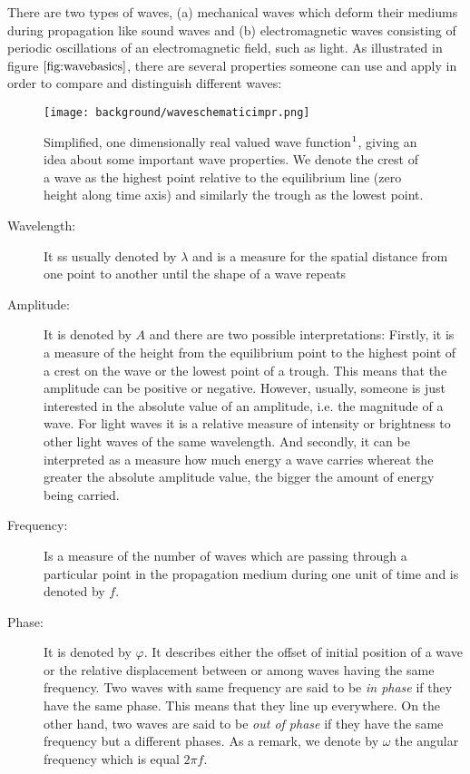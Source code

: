 There are two types of waves, (a) mechanical waves which deform their mediums during propagation like sound waves and (b) electromagnetic waves consisting of periodic oscillations of an electromagnetic field, such as light. As illustrated in figure $\ref{fig:wavebasics}$, there are several properties someone can use and apply in order to compare and distinguish different waves:

\begin{figure}[H]
  \centering
  \texttt{[image: background/waveschematicimpr.png]}
  \caption[Sinewave]{Simplified, one dimensionally real valued wave function$\footnotemark$, giving an idea about some important wave properties. We denote the crest of a wave as the highest point relative to the equilibrium line (zero height along time axis) and similarly the trough as the lowest point.}
  \label{fig:wavebasics}
\end{figure}

\begin{description}
  \item[Wavelength:] It ss usually denoted by $\lambda$ and is a measure for the spatial distance from one point to another until the shape of a wave repeats
  \item[Amplitude:] It is denoted by $A$ and there are two possible interpretations: Firstly, it is a measure of the height from the equilibrium point to the highest point of a crest on the wave or the lowest point of a trough. This means that the amplitude can be positive or negative. However, usually, someone is just interested in the absolute value of an amplitude, i.e. the magnitude of a wave. For light waves it is a relative measure of intensity or brightness to other light waves of the same wavelength. And secondly, it can be interpreted as a measure how much energy a wave carries whereat the greater the absolute amplitude value, the bigger the amount of energy being carried.
  \item[Frequency:] Is a measure of the number of waves which are passing through a particular point in the propagation medium during one unit of time and is denoted by $f$.
  \item[Phase:] It is denoted by $\varphi$. It describes either the offset of initial position of a wave or the relative displacement between or among waves having the same frequency. Two waves with same frequency are said to be \emph{in phase} if they have the same phase. This means that they line up everywhere. On the other hand, two waves are said to be \emph{out of phase} if they have the same frequency but a different phases. As a remark, we denote by $\omega$ the angular frequency which is equal $2\pi f$. 
\end{description}

